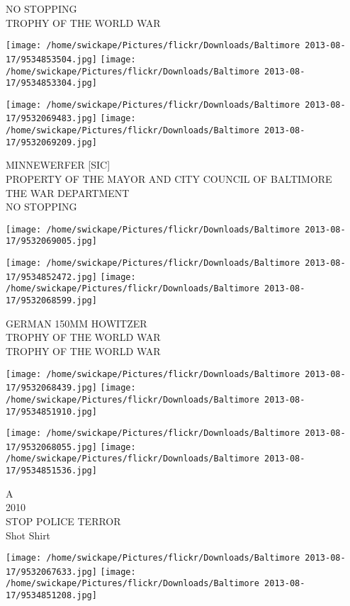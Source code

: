 \documentclass[10pt,letterpaper]{article}
\begin{document}
NO STOPPING\\
TROPHY OF THE WORLD WAR\\
\pagebreak

\texttt{[image: /home/swickape/Pictures/flickr/Downloads/Baltimore 2013-08-17/9534853504.jpg]}
\texttt{[image: /home/swickape/Pictures/flickr/Downloads/Baltimore 2013-08-17/9534853304.jpg]}

\texttt{[image: /home/swickape/Pictures/flickr/Downloads/Baltimore 2013-08-17/9532069483.jpg]}
\texttt{[image: /home/swickape/Pictures/flickr/Downloads/Baltimore 2013-08-17/9532069209.jpg]}

MINNEWERFER {[}SIC{]}\\
PROPERTY OF THE MAYOR AND CITY COUNCIL OF BALTIMORE\\
THE WAR DEPARTMENT\\
NO STOPPING\\
\pagebreak

\texttt{[image: /home/swickape/Pictures/flickr/Downloads/Baltimore 2013-08-17/9532069005.jpg]}

\vspace{0.25in}
\texttt{[image: /home/swickape/Pictures/flickr/Downloads/Baltimore 2013-08-17/9534852472.jpg]}
\texttt{[image: /home/swickape/Pictures/flickr/Downloads/Baltimore 2013-08-17/9532068599.jpg]}

GERMAN 150MM HOWITZER\\
TROPHY OF THE WORLD WAR\\
TROPHY OF THE WORLD WAR\\
\pagebreak

\texttt{[image: /home/swickape/Pictures/flickr/Downloads/Baltimore 2013-08-17/9532068439.jpg]}
\texttt{[image: /home/swickape/Pictures/flickr/Downloads/Baltimore 2013-08-17/9534851910.jpg]}

\texttt{[image: /home/swickape/Pictures/flickr/Downloads/Baltimore 2013-08-17/9532068055.jpg]}
\texttt{[image: /home/swickape/Pictures/flickr/Downloads/Baltimore 2013-08-17/9534851536.jpg]}

A\\
2010\\
STOP POLICE TERROR\\
Shot Shirt\\
\pagebreak

\texttt{[image: /home/swickape/Pictures/flickr/Downloads/Baltimore 2013-08-17/9532067633.jpg]}
\texttt{[image: /home/swickape/Pictures/flickr/Downloads/Baltimore 2013-08-17/9534851208.jpg]}
\end{document}
